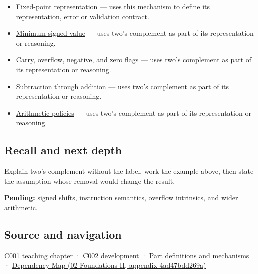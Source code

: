\begin{itemize}
\item
  \hyperref[appendix-1d0dbe8924cc]{Fixed-point representation} --- uses this mechanism to define its representation, error or validation contract.
\item
  \hyperref[appendix-05f39b10364d]{Minimum signed value} --- uses two's complement as part of its representation or reasoning.
\item
  \hyperref[appendix-8d687c9c08ab]{Carry, overflow, negative, and zero flags} --- uses two's complement as part of its representation or reasoning.
\item
  \hyperref[appendix-1c7df340573e]{Subtraction through addition} --- uses two's complement as part of its representation or reasoning.
\item
  \hyperref[appendix-2ed044358b82]{Arithmetic policies} --- uses two's complement as part of its representation or reasoning.
\end{itemize}

\subsection{Recall and next depth}\label{recall-and-next-depth}

Explain two's complement without the label, work the example above, then state the assumption whose removal would change the result.

\textbf{Pending:} signed shifts, instruction semantics, overflow intrinsics, and wider arithmetic.

\subsection{Source and navigation}\label{source-and-navigation}

\href{Continuous\%20Notes/Computing\%20Foundations\%20-\%20From\%20Bits\%20to\%20C++\%20and\%20Systems\%20APIs\#From\%20a\%20signal\%20to\%20an\%20interpretation}{C001 teaching chapter} · \href{Continuous\%20Notes/Computing\%20Foundations\%20-\%20From\%20Bits\%20to\%20C++\%20and\%20Systems\%20APIs\#Arithmetic\%20becomes\%20a\%20policy}{C002 development} · \hyperref[appendix-fd090d982a15]{Part definitions and mechanisms} · \href{}{Dependency Map (02-Foundations-II, appendix-4ad47bdd269a)}

